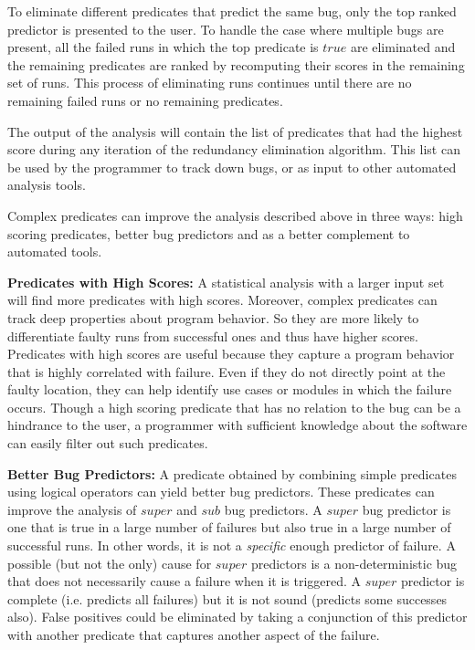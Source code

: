 To eliminate different predicates that predict the same bug, only the top ranked predictor is presented to the user.  To handle the case where multiple bugs are present, all the failed runs in which the top predicate is $true$ are eliminated and the remaining predicates are ranked by recomputing their scores in the remaining set of runs.  This process of eliminating runs continues until there are no remaining failed runs or no remaining predicates.  

The output of the analysis will contain the list of predicates that had the highest score during any iteration of the redundancy elimination algorithm.  This list can be used by the programmer to track down bugs, or as input to other automated analysis tools.
 
Complex predicates can improve the analysis described above in three ways: high scoring predicates, better bug predictors and as a better complement to automated tools.

\vspace{4pt} \noindent
{\bf Predicates with High Scores:} A statistical analysis with a larger input set will find more predicates with high scores.  Moreover, complex predicates can track deep properties about program behavior.  So they are more likely to differentiate faulty runs from successful ones and thus have higher scores.  Predicates with high scores are useful because they capture a program behavior that is highly correlated with failure.  Even if they do not directly point at the faulty location, they can help identify use cases or modules in which the failure occurs.  Though a high scoring predicate that has no relation to the bug can be a hindrance to the user, a programmer with sufficient knowledge about the software can easily filter out such predicates.

\vspace{4pt} \noindent
{\bf Better Bug Predictors:} A predicate obtained by combining simple predicates using logical operators can yield better bug predictors.  These predicates can improve the analysis of $super$ and $sub$ bug predictors.  A $super$ bug predictor is one that is true in a large number of failures but also true in a large number of successful runs.  In other words, it is not a {\em specific} enough predictor of failure.  A possible (but not the only) cause for $super$ predictors is a non-deterministic bug that does not necessarily cause a failure when it is triggered.  A $super$ predictor is complete (i.e. predicts all failures) but it is not sound (predicts some successes also).  False positives could be eliminated by taking a conjunction of this predictor with another predicate that captures another aspect of the failure.

